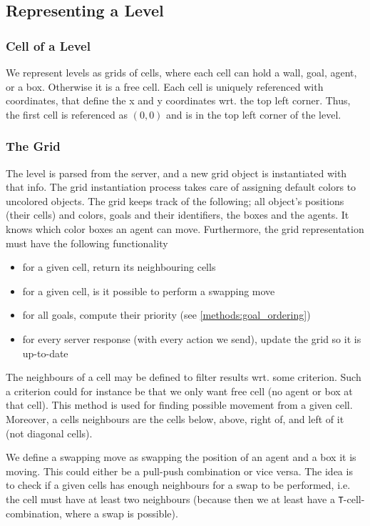 \subsection{Representing a Level}
\label{sec:representing a level}

\subsubsection{Cell of a Level}

We represent levels as grids of cells, where each cell can hold a wall, goal, agent, or a box.
Otherwise it is a free cell.
Each cell is uniquely referenced with coordinates, that define the x and y coordinates wrt. the top left corner.
Thus, the first cell is referenced as $(0,0)$ and is in the top left corner of the level.

\subsubsection{The Grid}

The level is parsed from the server, and a new grid object is instantiated with that info.
The grid instantiation process takes care of assigning default colors to uncolored objects.
The grid keeps track of the following; all object's positions (their cells) and colors, goals and their identifiers, the boxes and the agents.
It knows which color boxes an agent can move.
Furthermore, the grid representation must have the following functionality
%
\begin{itemize}
  \item for a given cell, return its neighbouring cells
  \item for a given cell, is it possible to perform a swapping move
  \item for all goals, compute their priority (see \cref{methods:goal_ordering})
  \item for every server response (with every action we send), update the grid so it is up-to-date
\end{itemize}
%
The neighbours of a cell may be defined to filter results wrt. some criterion.
Such a criterion could for instance be that we only want free cell (no agent or box at that cell).
This method is used for finding possible movement from a given cell.
Moreover, a cells neighbours are the cells below, above, right of, and left of it (not diagonal cells).

We define a swapping move as swapping the position of an agent and a box it is moving.
This could either be a pull-push combination or vice versa.
The idea is to check if a given cells has enough neighbours for a swap to be performed, i.e. the cell must have at least two neighbours (because then we at least have a \texttt{T}-cell-combination, where a swap is possible).

